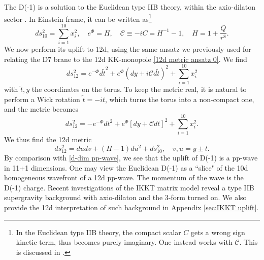 The D(-1) is a solution to the Euclidean type IIB theory, within the axio-dilaton sector \cite{Gibbons:1995vg}.
In Einstein frame, it can be written as\footnote{In the Euclidean type IIB theory, the compact scalar $C$ gets a wrong sign kinetic term, thus becomes purely imaginary. One instead works with $\mathcal C$. This is discussed in \cite{Gibbons:1995vg}.}
\begin{equation}
ds_{10}^2 = \sum_{i=1}^{10} x_i^2,\quad
e^\Phi = H, \quad
\mathcal C\equiv-iC = H^{-1}-1,\quad
H=1+\frac{Q}{r^8}.
\label{D-1 background}
\end{equation}
We now perform its uplift to 12d, using the same ansatz we previously used for relating the D7 brane to the 12d KK-monopole \eqref{12d metric ansatz 0}.
We find
\begin{equation}
ds_{12}^2=
e^{-\Phi}d\tilde{t}^2+e^\Phi(dy+i\mathcal C d\tilde{t})^2
+
 \sum_{i=1}^{10} x_i^2
\label{F-theory ansatz}
\end{equation}
with $\tilde{t},y$ the coordinates on the torus.
To keep the metric real, it is natural to perform a Wick rotation $\tilde{t}=-it$, which turns the torus into a non-compact one, and the metric becomes
\begin{equation}
ds_{12}^2=
-e^{-\Phi}dt^2+e^\Phi[dy+\mathcal C dt]^2
+\sum_{i=1}^{10}x_i^2.
\end{equation}
We thus find the 12d metric
\begin{equation}
ds_{12}^2
=
dudv
+(H-1)du^2
+ds_{10}^2,\quad
v,u = y\pm t.
\end{equation}
By comparison with \eqref{d-dim pp-wave}, we see that the uplift of D(-1) is a pp-wave in 11+1 dimensions.
One may view the Euclidean D(-1) as a ``slice" of the 10d homogeneous wavefront of a 12d pp-wave.
The momentum of the wave is the D(-1) charge.
Recent investigations of the IKKT matrix model \cite{Hartnoll:2024csr,Komatsu:2024bop} reveal a type IIB supergravity background with axio-dilaton and the 3-form turned on. We also provide the 12d interpretation of such background in Appendix \ref{sec:IKKT uplift}.

